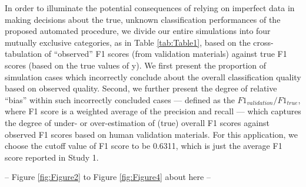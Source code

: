 \documentclass[man, 12pt, a4paper, nolmodern, noextraspace]{apa6}
\begin{document}
In order to illuminate the potential consequences of relying on imperfect data in making decisions about the true, unknown classification performances of the proposed automated procedure, we divide our entire simulations into four mutually exclusive categories, as in Table \ref{tab:Table1}, based on the cross-tabulation of \enquote{observed} F1 scores (from validation materials) against true F1 scores (based on the true values of y). We first present the proportion of simulation cases which incorrectly conclude about the overall classification quality based on observed quality. Second, we further present the degree of relative \enquote{bias} within such incorrectly concluded cases --- defined as the $ F1_{validation}/F1_{true} $, where F1 score is a weighted average of the precision and recall --- which captures the degree of under- or over-estimation of (true) overall F1 scores against observed F1 scores based on human validation materials. For this application, we choose the cutoff value of F1 score to be 0.6311, which is just the average F1 score reported in Study 1.
\centerline{ -- Figure \ref{fig:Figure2} to Figure \ref{fig:Figure4} about here -- }    
\end{document}
